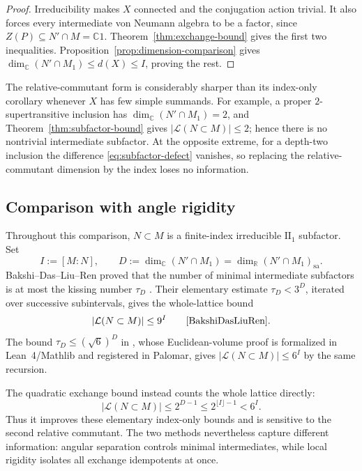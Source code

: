\documentclass[11pt]{amsart}
\theoremstyle{definition}
\theoremstyle{remark}
\newcommand{\CC}{\mathbb C}
\begin{document}
\begin{proof}
Irreducibility makes $X$ connected and the conjugation action trivial.
It also forces every intermediate von Neumann algebra to be a factor,
since $Z(P)\subseteq N'\cap M=\CC1$.
Theorem~\ref{thm:exchange-bound} gives the first two inequalities.
Proposition~\ref{prop:dimension-comparison} gives
$\dim_{\CC}(N'\cap M_1)\leq d(X)\leq I$, proving the rest.
\end{proof}

The relative-commutant form is considerably sharper than its index-only
corollary whenever $X$ has few simple summands.  For
example, a proper $2$-supertransitive inclusion has
$\dim_{\CC}(N'\cap M_1)=2$, and
Theorem~\ref{thm:subfactor-bound} gives
$|\mathcal L(N\subset M)|\leq2$; hence there is no nontrivial intermediate
subfactor.  At the opposite extreme, for a depth-two inclusion the difference
\eqref{eq:subfactor-defect} vanishes, so replacing the relative-commutant
dimension by the index loses no information.

\subsection{Comparison with angle rigidity}

Throughout this comparison, $N\subset M$ is a finite-index irreducible
$\mathrm{II}_1$ subfactor.  Set
\[
 I:=[M:N],
 \qquad
 D:=\dim_{\CC}(N'\cap M_1)
   =\dim_{\mathbb R}(N'\cap M_1)_{\mathrm{sa}}.
\]
Bakshi--Das--Liu--Ren proved that the number of minimal intermediate
subfactors is at most the kissing number $\tau_D$
\cite[Theorem~4.1]{BakshiDasLiuRen}.  Their elementary estimate
$\tau_D<3^D$, iterated over successive subintervals, gives the
whole-lattice bound
\begin{equation}\label{eq:bdlr-general}
 |\mathcal L(N\subset M)|\leq9^I
 \qquad\text{\cite[Theorem~4.6]{BakshiDasLiuRen}}.
\end{equation}
The bound $\tau_D\leq(\sqrt6)^D$ in
\cite{PalcouxSqrtSix}, whose Euclidean-volume proof is formalized in
Lean~4/Mathlib and registered in Palomar, gives
$|\mathcal L(N\subset M)|\leq6^I$ by the same recursion.

The quadratic exchange bound instead counts the whole lattice directly:
\begin{equation}\label{eq:comparison-bounds}
 |\mathcal L(N\subset M)|
 \leq2^{D-1}
 \leq2^{\lfloor I\rfloor-1}
 <6^I.
\end{equation}
Thus it improves these elementary index-only bounds and is sensitive to the
second relative commutant.  The two methods nevertheless capture different
information: angular separation controls minimal intermediates, while
local rigidity isolates all exchange idempotents at once.
\end{document}
